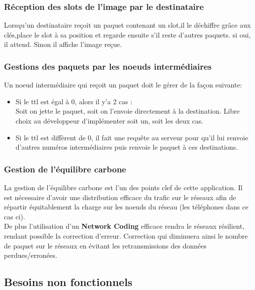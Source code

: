 \documentclass[a4paper, 12pt]{article}
\begin{document}
        \subsubsection{Réception des slots de l'image par le destinataire}
        Lorsqu'un destinataire reçoit un paquet contenant un slot,il le déchiffre grâce aux clés,place le slot à sa position et regarde ensuite s'il reste d'autres paquets.
        si oui, il attend. Sinon il affiche l'image reçue.
        \subsubsection{Gestions des paquets par les noeuds intermédiaires}
        Un noeud intermédiaire qui reçoit un paquet doit le gérer de la façon suivante:\\
        \begin{itemize}%
            \item Si le ttl est égal à 0, alors il y'a 2 cas :\\
            Soit on jette le paquet, soit on l'envoie directement à la destination.
            Libre choix au développeur d'implémenter soit un, soit les deux cas. 
            \item Si le ttl est diffèrent de 0, il fait une requête au serveur pour qu'il lui renvoie d'autres numéros intermédiaires puis renvoie le paquet à ces destinations.
        \end{itemize}
        
                
            
            
            
        \subsubsection{Gestion de l'équilibre carbone}
            La gestion de l'équilibre carbone est l'un des points clef de cette application. Il est nécessaire d'avoir une distribution efficace du trafic sur le réseaux afin de répartir équitablement la charge sur les noeuds du réseau (les téléphones dans ce cas ci).\\
            De plus l'utilisation d'un \textbf{Network Coding} efficace rendra le réseaux résilient, rendant possible la correction d'erreur. Correction qui diminuera ainsi le nombre de paquet sur le réseaux en évitant les retransmissions des données perdues/erronées.
        
        
    \subsection{Besoins non fonctionnels}
        
\end{document}
